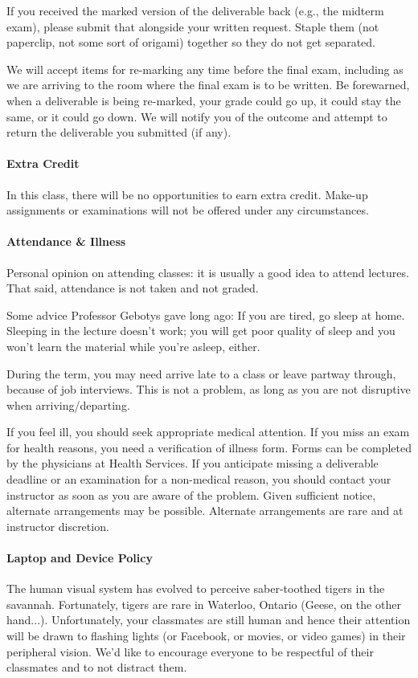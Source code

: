 \documentclass[letterpaper,10pt]{article}
\begin{document}
If you received the marked version of the deliverable back (e.g., the midterm exam), please submit that alongside your written request. Staple them (not paperclip, not some sort of origami) together so they do not get separated.

We will accept items for re-marking any time before the final exam, including as we are arriving to the room where the final exam is to be written. Be forewarned, when a deliverable is being re-marked, your grade could go up, it could stay the same, or it could go down. We will notify you of the outcome and attempt to return the deliverable you submitted (if any).

\paragraph{Extra Credit}
In this class, there will be no opportunities to earn extra credit. Make-up assignments or examinations will not be offered under any circumstances.

\paragraph{Attendance \& Illness}

Personal opinion on attending classes: it is usually a good idea to attend lectures. That said, attendance is not taken and not graded.

Some advice Professor Gebotys gave long ago: If you are tired, go sleep at home. Sleeping in the lecture doesn't work; you will get poor quality of sleep and you won't learn the material while you're asleep, either.

During the term, you may need arrive late to a class or leave partway through, because of job interviews. This is not a problem, as long as you are not disruptive when arriving/departing.

If you feel ill, you should seek appropriate medical attention. If you miss an exam for health reasons, you need a verification of illness form. Forms can be completed by the physicians at Health Services. If you anticipate missing a deliverable deadline or an examination for a non-medical reason, you should contact your instructor as soon as you are aware of the problem. Given sufficient notice, alternate arrangements may be possible. Alternate arrangements are rare and at instructor discretion.

\paragraph{Laptop and Device Policy}
The human visual system has evolved to perceive saber-toothed tigers
in the savannah. Fortunately, tigers are rare in Waterloo, Ontario
(Geese, on the other hand...).
Unfortunately, your classmates are still human and hence their
attention will be drawn to flashing lights (or Facebook, or movies, or
video games) in their peripheral vision. We'd like to encourage
everyone to be respectful of their classmates and to not distract them.
\end{document}
